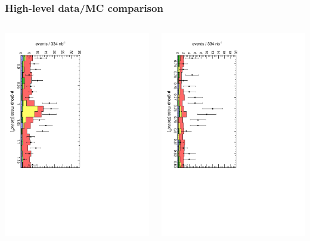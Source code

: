 \documentclass[compress]{beamer}
\begin{document}
\begin{frame}
\frametitle{High-level data/MC comparison}
\begin{columns}
\includegraphics[height=\linewidth, angle=90]{Mu5_mass_phi.pdf}

\includegraphics[height=\linewidth, angle=90]{Mu5_mass_omg.pdf}


\end{columns}
\end{frame}
\end{document}
